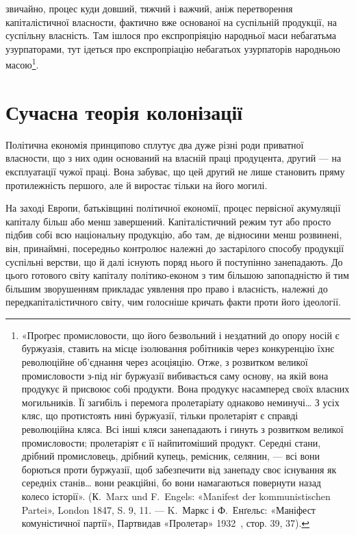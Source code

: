 \parcont{}  %
звичайно, процес куди довший, тяжчий і важчий, аніж перетворення
капіталістичної власности, фактично вже основаної на суспільній
продукції, на суспільну власність. Там ішлося про експропріяцію
народньої маси небагатьма узурпаторами, тут ідеться
про експропріацію небагатьох узурпаторів народньою масою\footnote{
«Проґрес промисловости, що його безвольний і нездатний до
опору носій є буржуазія, ставить на місце ізолювання робітників через
конкуренцію їхнє революційне об’єднання через асоціяцію. Отже, з розвитком
великої промисловости з-під ніг буржуазії вибивається саму основу,
на якій вона продукує й присвоює собі продукти. Вона продукує насамперед
своїх власних могильників. Її загибіль і перемога пролетаріату
однаково неминучі\dots{} З усіх кляс, що протистоять нині буржуазії, тільки
пролетаріят є справді революційна кляса. Всі інші кляси занепадають і
гинуть з розвитком великої промисловости; пролетаріят є її найпитоміший
продукт. Середні стани, дрібний промисловець, дрібний купець, ремісник,
селянин, — всі вони борються проти буржуазії, щоб забезпечити від
занепаду своє існування як середніх станів\dots{} вони реакційні, бо вони
намагаються повернути назад колесо історії». (К.~Marx und F.~Engels:
«Manifest der kommunistischen Partei», London 1847, S. 9, 11. — K.~Маркс
і Ф.~Енґельс: «Маніфест комуністичної партії», Партвидав «Пролетар»
1932~, стор. 39, 37).
}.

\section[Сучасна теорія колонізації]{Сучасна теорія колонізації\footnotemark{}}

Політична економія принципово сплутує два дуже різні
роди приватної власности, що з них один оснований на власній
праці продуцента, другий — на експлуатації чужої праці.
Вона забуває, що цей другий не лише становить пряму протилежність
першого, але й виростає тільки на його могилі.

На заході Европи, батьківщині політичної економії, процес
первісної акумуляції капіталу більш або менш завершений.
Капіталістичний режим тут або просто підбив собі всю національну
продукцію, або там, де відносини менш розвинені, він, принаймні,
посередньо контролює належні до застарілого способу
продукції суспільні верстви, що й далі існують поряд нього й
поступінно занепадають. До цього готового світу капіталу політико-економ
з тим більшою запопадністю й тим більшим
зворушенням прикладає уявлення про право і власність, належні
до передкапіталістичного світу, чим голосніше кричать
факти проти його ідеології.

